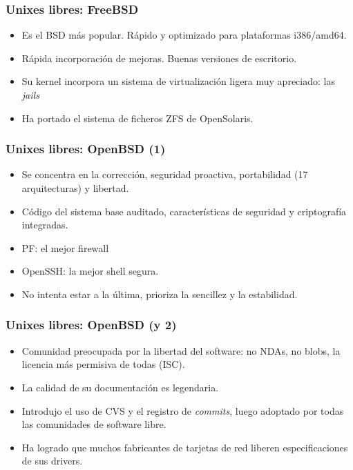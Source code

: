 \documentclass{beamer}
\begin{document}

\begin{frame}
\frametitle{Unixes libres: FreeBSD}

\begin{itemize}
\item Es el BSD más popular. Rápido y optimizado para plataformas i386/amd64.
\item Rápida incorporación de mejoras. Buenas versiones de escritorio.
\item Su kernel incorpora un sistema de virtualización ligera muy apreciado: las \textit{jails}
\item Ha portado el sistema de ficheros ZFS de OpenSolaris.
\end{itemize}

\end{frame}


\begin{frame}
\frametitle{Unixes libres: OpenBSD (1)}

\begin{itemize}
\item Se concentra en la corrección, seguridad proactiva, portabilidad (17 arquitecturas) y libertad.
\item Código del sistema base auditado, características de seguridad y criptografía integradas. 
\item PF: el mejor firewall
\item OpenSSH: la mejor shell segura.
\item No intenta estar a la última, prioriza la sencillez y la estabilidad.
\end{itemize}


\end{frame}


\begin{frame}
\frametitle{Unixes libres: OpenBSD (y 2)}


\begin{itemize}
\item Comunidad preocupada por la libertad del software: no NDAs, no blobs, la licencia más permisiva de todas (ISC). 
\item La calidad de su documentación es legendaria.
\item Introdujo el uso de CVS y el registro de \textit{commits}, luego adoptado por todas las comunidades de software libre. 
\item Ha logrado que muchos fabricantes de tarjetas de red liberen especificaciones de sus drivers.

\end{itemize}

\end{frame}
\end{document}
